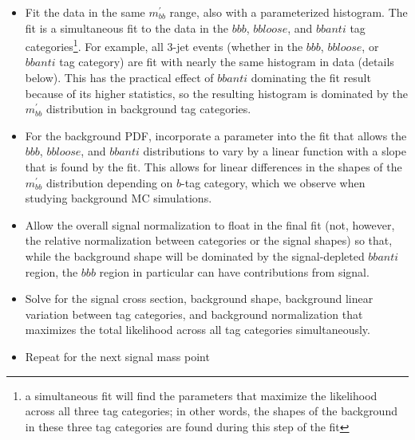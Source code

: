 \begin{itemize}
    \item Fit the data in the same $m_{bb}^{'}$ range, also with a parameterized histogram.
    The fit is a simultaneous fit to the data in the 
    $bbb$, $bbloose$, and $bbanti$ tag
    categories\footnote{a simultaneous fit will find the parameters that maximize the likelihood
    across all three tag categories; in other words, the shapes of the background in these three
    tag categories are found during this step of the fit}.
    For example, all 3-jet events (whether in the
    $bbb$, $bbloose$, or $bbanti$ tag category) are fit with nearly the same histogram in data (details below).
    This has the practical effect of $bbanti$ dominating the fit result because of its
    higher statistics, so the resulting
    histogram is dominated by the $m_{bb}^{'}$ distribution in background tag categories.
    \item For the background PDF, incorporate a parameter into the fit that allows the $bbb$,
    $bbloose$, and $bbanti$ distributions to vary by a linear function with a slope that is
    found by the fit.  This allows for linear differences in the shapes of the $m^{'}_{bb}$ distribution
    depending on $b$-tag category, which we observe when studying background MC simulations.
    \item Allow the overall signal normalization to float in the final fit (not, however, the relative normalization
    between categories or the signal shapes) so that, while the background shape will be
    dominated by the signal-depleted $bbanti$ region, the $bbb$ region in particular can
    have contributions from signal.
    \item Solve for the signal cross section, background shape, background linear variation
    between tag categories, and background normalization
    that maximizes the total likelihood across
    all tag categories simultaneously.
    \item Repeat for the next signal mass point
\end{itemize}

